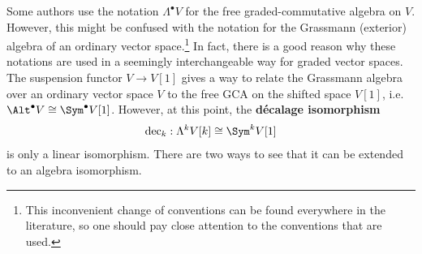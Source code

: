     \begin{remark}\label{hda:decalage}
        Some authors use the notation $\Lambda^\bullet V$ for the free graded-commutative algebra on $V$. However, this might be confused with the notation for the Grassmann (exterior) algebra of an ordinary vector space.\footnote{This inconvenient change of conventions can be found everywhere in the literature, so one should pay close attention to the conventions that are used.} In fact, there is a good reason why these notations are used in a seemingly interchangeable way for graded vector spaces. The suspension functor $V\rightarrow V[1]$ gives a way to relate the Grassmann algebra over an ordinary vector space $V$ to the free GCA on the shifted space $V[1]$, i.e. $\Alt^\bullet V\cong\Sym^\bullet V[1]$. However, at this point, the \textbf{d\'ecalage isomorphism}
        \begin{gather}
            \mathrm{dec}_k:\Lambda^kV[k]\cong\Sym^kV[1]
        \end{gather}
        is only a linear isomorphism. There are two ways to see that it can be extended to an algebra isomorphism.


\end{remark}
